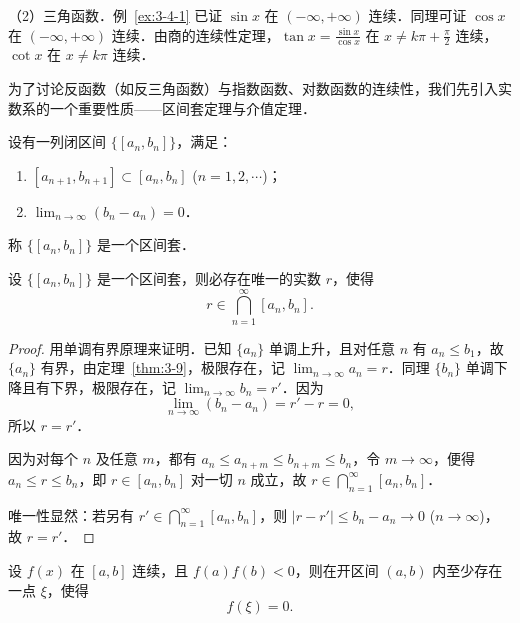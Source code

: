 （2）三角函数．例~\ref{ex:3-4-1} 已证 $\sin x$ 在 $(-\infty, +\infty)$ 连续．同理可证 $\cos x$ 在 $(-\infty, +\infty)$ 连续．由商的连续性定理，$\tan x = \frac{\sin x}{\cos x}$ 在 $x \neq k\pi + \frac{\pi}{2}$ 连续，$\cot x$ 在 $x \neq k\pi$ 连续．

为了讨论反函数（如反三角函数）与指数函数、对数函数的连续性，我们先引入实数系的一个重要性质——区间套定理与介值定理．

设有一列闭区间 $\{[a_n, b_n]\}$，满足：
\begin{enumerate}[label=(\roman*)]
\item $[a_{n+1}, b_{n+1}] \subset [a_n, b_n]$ ($n = 1, 2, \cdots$)；
\item $\lim_{n \to \infty} (b_n - a_n) = 0$．
\end{enumerate}
称 $\{[a_n, b_n]\}$ 是一个区间套．

\begin{theorem}[区间套定理]\label{thm:3-16}
设 $\{[a_n, b_n]\}$ 是一个区间套，则必存在唯一的实数 $r$，使得
\[
r \in \bigcap_{n=1}^\infty [a_n, b_n].
\]
\end{theorem}

\begin{proof}
用单调有界原理来证明．已知 $\{a_n\}$ 单调上升，且对任意 $n$ 有 $a_n \leqslant b_1$，故 $\{a_n\}$ 有界，由定理~\ref{thm:3-9}，极限存在，记 $\lim_{n \to \infty} a_n = r$．同理 $\{b_n\}$ 单调下降且有下界，极限存在，记 $\lim_{n \to \infty} b_n = r'$．因为
\[
\lim_{n \to \infty} (b_n - a_n) = r' - r = 0,
\]
所以 $r = r'$．

因为对每个 $n$ 及任意 $m$，都有 $a_n \leqslant a_{n+m} \leqslant b_{n+m} \leqslant b_n$，令 $m \to \infty$，便得 $a_n \leqslant r \leqslant b_n$，即 $r \in [a_n, b_n]$ 对一切 $n$ 成立，故 $r \in \bigcap_{n=1}^\infty [a_n, b_n]$．

唯一性显然：若另有 $r' \in \bigcap_{n=1}^\infty [a_n, b_n]$，则 $|r - r'| \leqslant b_n - a_n \to 0$ ($n \to \infty$)，故 $r = r'$．
\end{proof}

\begin{theorem}[零点存在定理]\label{thm:3-17}
设 $f(x)$ 在 $[a, b]$ 连续，且 $f(a)f(b) < 0$，则在开区间 $(a, b)$ 内至少存在一点 $\xi$，使得
\[
f(\xi) = 0.
\]
\end{theorem}

